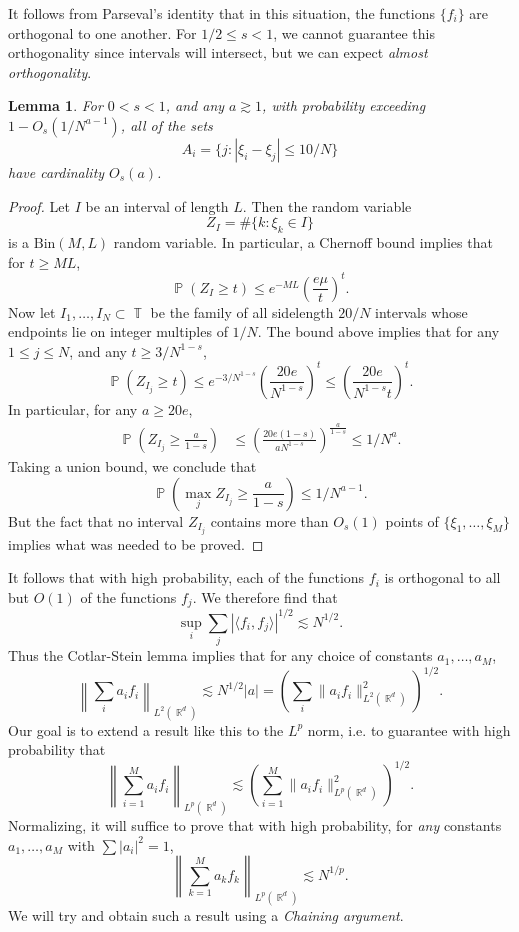 \documentclass[dvipsnames,letterpaper,12pt]{article}
\numberwithin{equation}{section}
\DeclareMathOperator{\RR}{\mathbb{R}}
\DeclareMathOperator{\TT}{\mathbb{T}}
\newtheorem{lemma}[theorem]{Lemma}
\numberwithin{theorem}{section}
\DeclareMathOperator{\PP}{\mathbb{P}}
\begin{document}
It follows from Parseval's identity that in this situation, the functions $\{ f_i \}$ are orthogonal to one another. For $1/2 \leq s < 1$, we cannot guarantee this orthogonality since intervals will intersect, but we can expect \emph{almost orthogonality}.

\begin{lemma}
    For $0 < s < 1$, and any $a \gtrsim 1$, with probability exceeding $1 - O_s(1/N^{a-1})$, all of the sets
    \[ A_i = \{ j : |\xi_i - \xi_j| \leq 10/N \} \]
    have cardinality $O_s(a)$.
\end{lemma}
\begin{proof}
    Let $I$ be an interval of length $L$. Then the random variable
    \[ Z_I = \# \{ k: \xi_k \in I \} \]
    is a $\text{Bin}(M,L)$ random variable. In particular, a Chernoff bound implies that for $t \geq ML$,
    \[ \PP( Z_I \geq t ) \leq e^{-ML} \left( \frac{e \mu}{t} \right)^t. \]
    Now let $I_1,\dots,I_N \subset \TT$ be the family of all sidelength $20/N$ intervals whose endpoints lie on integer multiples of $1/N$. The bound above implies that for any $1 \leq j \leq N$, and any $t \geq 3/N^{1-s}$,
    \[ \PP( Z_{I_j} \geq t ) \leq e^{-3/N^{1-s}} \left( \frac{20e}{N^{1-s}} \right)^t \leq \left( \frac{20e}{N^{1-s} t} \right)^t. \]
    In particular, for any $a \geq 20e$,
    \begin{align*}
        \PP \left(Z_{I_j} \geq \frac{a}{1 - s} \right) &\leq \left( \frac{20e(1-s)}{a N^{1-s}} \right)^{\frac{a}{1-s}} \leq 1/N^a.
    \end{align*}
    Taking a union bound, we conclude that
    \[ \PP \left( \max_j Z_{I_j} \geq \frac{a}{1-s} \right) \leq 1/N^{a-1}. \]
    But the fact that no interval $Z_{I_j}$ contains more than $O_s(1)$ points of $\{ \xi_1,\dots, \xi_M \}$ implies what was needed to be proved.
\end{proof}

It follows that with high probability, each of the functions $f_i$ is orthogonal to all but $O(1)$ of the functions $f_j$. We therefore find that
%
\[ \sup_i \sum_j |\langle f_i, f_j \rangle|^{1/2} \lesssim N^{1/2}. \]
%
Thus the Cotlar-Stein lemma implies that for any choice of constants $a_1,\dots,a_M$,
%
\[ \left\| \sum_i a_i f_i \right\|_{L^2(\RR^d)} \lesssim N^{1/2} |a| = \left( \sum_i \| a_i f_i \|_{L^2(\RR^d)}^2 \right)^{1/2}. \]
%
Our goal is to extend a result like this to the $L^p$ norm, i.e. to guarantee with high probability that
%
\[ \left\| \sum_{i = 1}^M a_i f_i \right\|_{L^p(\RR^d)} \lesssim \left( \sum_{i = 1}^M \| a_i f_i \|_{L^p(\RR^d)}^2 \right)^{1/2}. \]
%
Normalizing, it will suffice to prove that with high probability, for \emph{any} constants $a_1,\dots,a_M$ with $\sum |a_i|^2 = 1$,
%
\[ \left\| \sum_{k = 1}^M a_k f_k \right\|_{L^p(\RR^d)} \lesssim N^{1/p}. \]
%
We will try and obtain such a result using a \emph{Chaining argument}. 
\end{document}
